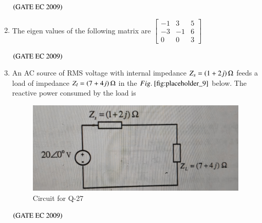\documentclass[journal,12pt,onecolumn]{IEEEtran}
\theoremstyle{remark}
\begin{document}
\begin{enumerate}[start=1, label={Q\arabic*.}]
\begin{enumerate}
\end{enumerate}
\hfill $\left(\text{GATE EC 2009}\right)$

\item The eigen values of the following matrix are 
$
\begin{bmatrix}
    -1 &3&5\\
    -3&-1&6\\
    0&0&3
\end{bmatrix}
$

\begin{enumerate}
\end{enumerate}
\hfill $\left(\text{GATE EC 2009}\right)$

\item An AC source of RMS voltage with internal impedance $Z_s = \left(1+2j\right) \ohm$ feeds a load of impedance $Z_l = \left(7+4j\right) \ohm$ in the $\figref{fig:placeholder_9}$ below. The reactive power consumed by the load is 
\begin{figure}[H]
    \centering
    \includegraphics[width=0.5\columnwidth]{figs/img_9.jpg}
    \caption{\centering Circuit for Q-27}
    \label{fig:placeholder_9}
\end{figure}
\begin{enumerate}
\end{enumerate}
\hfill $\left(\text{GATE EC 2009}\right)$


\end{enumerate}
\end{document}
